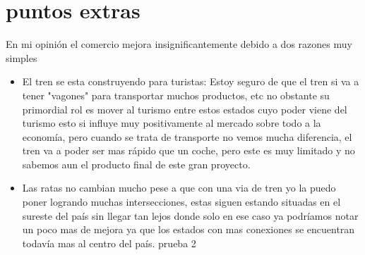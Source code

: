 \documentclass{article}
\begin{document}
\section{puntos extras}
En mi opinión el comercio mejora insignificantemente debido a dos razones muy simples
\begin{itemize}
  \item El tren se esta construyendo para turistas:
  Estoy seguro de que el tren si va a tener "vagones" para transportar muchos productos, etc 
  no obstante su primordial rol es mover al turismo entre estos estados cuyo poder viene del turismo
  esto si influye muy positivamente al mercado sobre todo a la economía, pero cuando se trata de 
  transporte no vemos mucha diferencia, el tren va a poder ser mas rápido que un coche, pero este 
  es muy limitado y no sabemos aun el producto final de este gran proyecto. 
  \item Las ratas no cambian mucho
  pese a que con una via de tren yo la puedo poner logrando muchas intersecciones, estas siguen 
  estando situadas en el sureste del país sin llegar tan lejos donde solo en ese caso ya podríamos
  notar un poco mas de mejora ya que los estados con mas conexiones se encuentran todavía mas al centro
  del país.
	prueba 2
\end{itemize}




  
\end{document}

